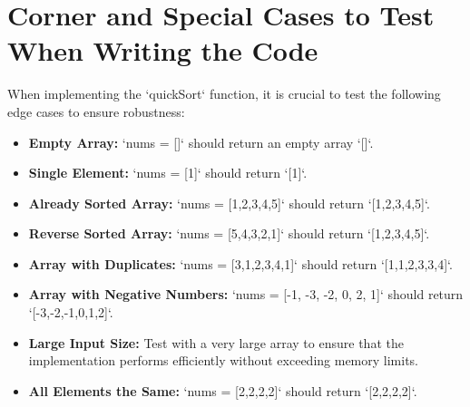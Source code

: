 \section*{Corner and Special Cases to Test When Writing the Code}
When implementing the `quickSort` function, it is crucial to test the following edge cases to ensure robustness:

\begin{itemize}
    \item \textbf{Empty Array:} `nums = []` should return an empty array `[]`.
    
    \item \textbf{Single Element:} `nums = [1]` should return `[1]`.
    
    \item \textbf{Already Sorted Array:} `nums = [1,2,3,4,5]` should return `[1,2,3,4,5]`.
    
    \item \textbf{Reverse Sorted Array:} `nums = [5,4,3,2,1]` should return `[1,2,3,4,5]`.
    
    \item \textbf{Array with Duplicates:} `nums = [3,1,2,3,4,1]` should return `[1,1,2,3,3,4]`.
    
    \item \textbf{Array with Negative Numbers:} `nums = [-1, -3, -2, 0, 2, 1]` should return `[-3,-2,-1,0,1,2]`.
    
    \item \textbf{Large Input Size:} Test with a very large array to ensure that the implementation performs efficiently without exceeding memory limits.
    
    \item \textbf{All Elements the Same:} `nums = [2,2,2,2]` should return `[2,2,2,2]`.
\end{itemize}

\printindex